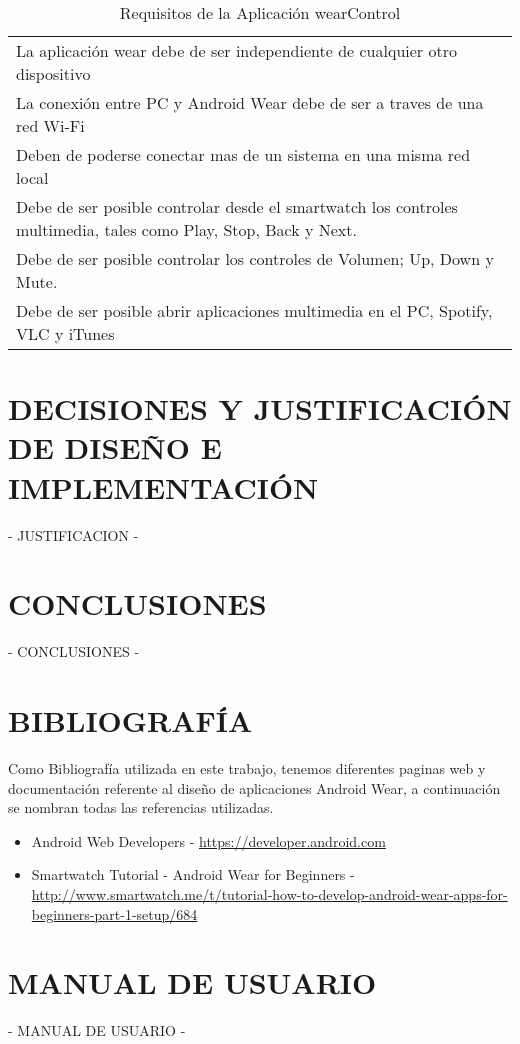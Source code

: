 \documentclass{documentation}
\begin{document}
\begin{table}[hp]
  \centering
  \caption{Requisitos de la Aplicación wearControl}
  \label{tab:competencias}

  \begin{tabular}{p{}}
    \hline
    La aplicación wear debe de ser independiente de cualquier otro dispositivo\\
    La conexión entre PC y Android Wear debe de ser a traves de una red Wi-Fi\\
    Deben de poderse conectar mas de un sistema en una misma red local\\
    Debe de ser posible controlar desde el smartwatch los controles multimedia, tales como Play, Stop, Back y Next.\\
    Debe de ser posible controlar los controles de Volumen; Up, Down y Mute. \\
    Debe de ser posible abrir aplicaciones multimedia en el PC, Spotify, VLC y iTunes \\
    \hline
  \end{tabular}
\end{table}

\newpage
\section{DECISIONES Y JUSTIFICACIÓN DE DISEÑO E IMPLEMENTACIÓN}

- JUSTIFICACION -


\section{CONCLUSIONES}

- CONCLUSIONES -

\section{BIBLIOGRAFÍA}

Como Bibliografía utilizada en este trabajo, tenemos diferentes paginas web y documentación referente al diseño de aplicaciones Android Wear, a continuación se nombran todas las referencias utilizadas.

\begin{itemize}
\item Android Web Developers - \url{https://developer.android.com}
\item Smartwatch Tutorial - Android Wear for Beginners - \url{http://www.smartwatch.me/t/tutorial-how-to-develop-android-wear-apps-for-beginners-part-1-setup/684}
\end{itemize}


\section{MANUAL DE USUARIO}

- MANUAL DE USUARIO -
\end{document}
